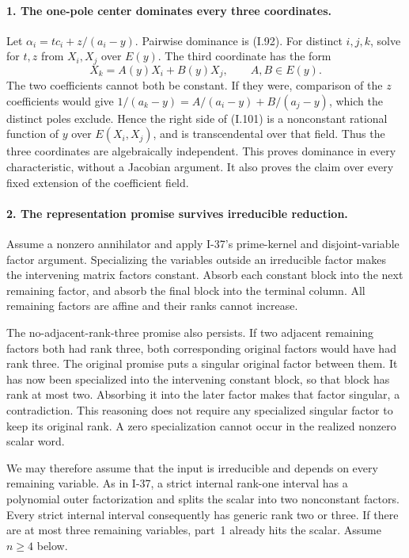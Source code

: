 \paragraph{1. The one-pole center dominates every three coordinates.}
Let $\alpha_i=tc_i+z/(a_i-y)$. Pairwise dominance is (I.92).
For distinct $i,j,k$, solve for $t,z$ from $X_i,X_j$ over $E(y)$.
The third coordinate has the form
\[
 X_k=A(y)X_i+B(y)X_j,
 \qquad A,B\in E(y).
 \tag{I.101}
\]
The two coefficients cannot both be constant. If they were,
comparison of the $z$ coefficients would give
$1/(a_k-y)=A/(a_i-y)+B/(a_j-y)$, which the distinct poles
exclude. Hence the right side of (I.101) is a nonconstant
rational function of $y$ over $E(X_i,X_j)$, and is transcendental
over that field. Thus the three coordinates are algebraically
independent. This proves dominance in every characteristic,
without a Jacobian argument. It also proves the claim over every
fixed extension of the coefficient field.

\paragraph{2. The representation promise survives irreducible reduction.}
Assume a nonzero annihilator and apply I-37's prime-kernel and
disjoint-variable factor argument. Specializing the variables
outside an irreducible factor makes the intervening matrix
factors constant. Absorb each constant block into the next
remaining factor, and absorb the final block into the terminal
column. All remaining factors are affine and their ranks cannot
increase.

The no-adjacent-rank-three promise also persists. If two adjacent
remaining factors both had rank three, both corresponding
original factors would have had rank three. The original promise
puts a singular original factor between them. It has now been
specialized into the intervening constant block, so that block
has rank at most two. Absorbing it into the later factor makes
that factor singular, a contradiction. This reasoning does not
require any specialized singular factor to keep its original
rank. A zero specialization cannot occur in the realized nonzero
scalar word.

We may therefore assume that the input is irreducible and depends
on every remaining variable. As in I-37, a strict internal
rank-one interval has a polynomial outer factorization and
splits the scalar into two nonconstant factors. Every strict
internal interval consequently has generic rank two or three.
If there are at most three remaining variables, part~1 already
hits the scalar. Assume $n\ge4$ below.

